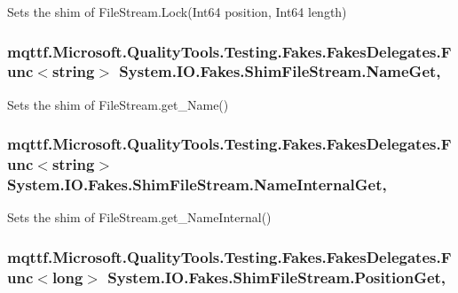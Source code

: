 Sets the shim of File\-Stream.\-Lock(\-Int64 position, Int64 length)

\hypertarget{class_system_1_1_i_o_1_1_fakes_1_1_shim_file_stream_a1be1b880f0250e6f71d978f117fdf081}{
\subsubsection[{Name\-Get}]{\setlength{\rightskip}{0pt plus 5cm}mqttf.\-Microsoft.\-Quality\-Tools.\-Testing.\-Fakes.\-Fakes\-Delegates.\-Func$<$string$>$ System.\-I\-O.\-Fakes.\-Shim\-File\-Stream.\-Name\-Get\hspace{0.3cm}{\ttfamily [get]}, {\ttfamily [set]}}}\label{class_system_1_1_i_o_1_1_fakes_1_1_shim_file_stream_a1be1b880f0250e6f71d978f117fdf081}


Sets the shim of File\-Stream.\-get\-\_\-\-Name()

\hypertarget{class_system_1_1_i_o_1_1_fakes_1_1_shim_file_stream_ad56ed78010c27dabf376829c988776aa}{
\subsubsection[{Name\-Internal\-Get}]{\setlength{\rightskip}{0pt plus 5cm}mqttf.\-Microsoft.\-Quality\-Tools.\-Testing.\-Fakes.\-Fakes\-Delegates.\-Func$<$string$>$ System.\-I\-O.\-Fakes.\-Shim\-File\-Stream.\-Name\-Internal\-Get\hspace{0.3cm}{\ttfamily [get]}, {\ttfamily [set]}}}\label{class_system_1_1_i_o_1_1_fakes_1_1_shim_file_stream_ad56ed78010c27dabf376829c988776aa}


Sets the shim of File\-Stream.\-get\-\_\-\-Name\-Internal()

\hypertarget{class_system_1_1_i_o_1_1_fakes_1_1_shim_file_stream_a9f54800452b0c6b7ff7e83b58df31db1}{
\subsubsection[{Position\-Get}]{\setlength{\rightskip}{0pt plus 5cm}mqttf.\-Microsoft.\-Quality\-Tools.\-Testing.\-Fakes.\-Fakes\-Delegates.\-Func$<$long$>$ System.\-I\-O.\-Fakes.\-Shim\-File\-Stream.\-Position\-Get\hspace{0.3cm}{\ttfamily [get]}, {\ttfamily [set]}}}\label{class_system_1_1_i_o_1_1_fakes_1_1_shim_file_stream_a9f54800452b0c6b7ff7e83b58df31db1}


